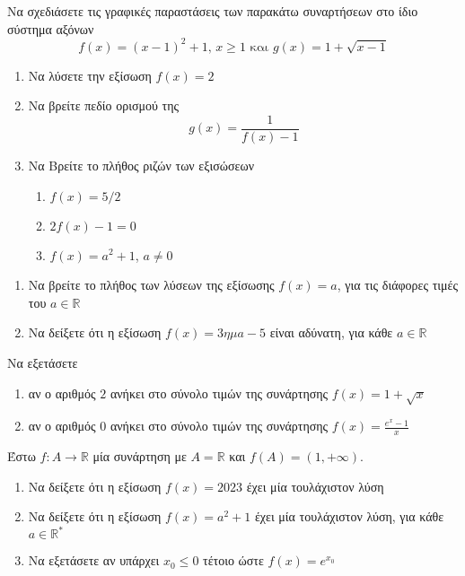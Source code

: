 \documentclass{presentation}
\begin{document}
\begin{askisi}
  Να σχεδιάσετε τις γραφικές παραστάσεις των παρακάτω συναρτήσεων στο ίδιο σύστημα αξόνων
  $$f(x)=(x-1)^2+1\text{, } x\ge 1 \text{ και } g(x)=1+\sqrt{x-1}$$
\end{askisi}

\begin{askisi}
  \href{https://www.geogebra.org/m/euy2uhma}{}
  \begin{enumerate}
    \item<1-> Να λύσετε την εξίσωση $f(x)=2$
    \item<2-> Να βρείτε πεδίο ορισμού της $$g(x)=\frac{1}{f(x)-1}$$
    \item<3-> Να Βρείτε το πλήθος ριζών των εξισώσεων
          \begin{enumerate}
            \item<4-> $f(x)=5/2$
            \item<5-> $2f(x)-1=0$
            \item<6-> $f(x)=a^2+1$, $a\ne 0$
          \end{enumerate}
  \end{enumerate}
\end{askisi}

\begin{askisi}
  \href{https://www.geogebra.org/m/dvzdm7bw}{}
  \begin{enumerate}
    \item<1-> Να βρείτε το πλήθος των λύσεων της εξίσωσης $f(x)=a$, για τις διάφορες τιμές του $a\in\mathbb{R}$
    \item<2-> Να δείξετε ότι η εξίσωση $f(x)=3ημ a - 5$ είναι αδύνατη, για κάθε $a\in\mathbb{R}$
  \end{enumerate}
\end{askisi}

\begin{askisi}
  Να εξετάσετε
  \begin{enumerate}
    \item<1-> αν ο αριθμός $2$ ανήκει στο σύνολο τιμών της συνάρτησης $f(x)=1+\sqrt{x}$
    \item<2-> αν ο αριθμός $0$ ανήκει στο σύνολο τιμών της συνάρτησης $f(x)=\frac{e^x-1}{x}$
  \end{enumerate}
\end{askisi}

\begin{askisi}
  Έστω $f:A\to\mathbb{R}$ μία συνάρτηση με $A=\mathbb{R}$ και $f(A)=(1,+\infty)$.
  \begin{enumerate}
    \item<1-> Να δείξετε ότι η εξίσωση $f(x)=2023$ έχει μία τουλάχιστον λύση
    \item<2-> Να δείξετε ότι η εξίσωση $f(x)=a^2+1$ έχει μία τουλάχιστον λύση, για κάθε $a\in\mathbb{R^*}$
    \item<3-> Να εξετάσετε αν υπάρχει $x_0\le 0$ τέτοιο ώστε $f(x)=e^{x_0}$
  \end{enumerate}
\end{askisi}
\end{document}
